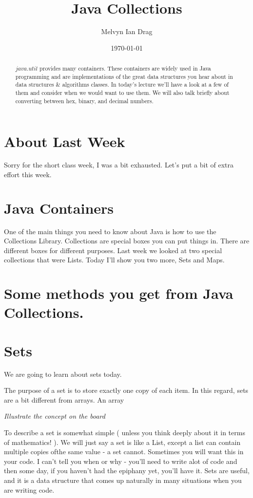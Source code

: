 \documentclass[12pt]{article}
\title{Java Collections}
\author{
	Melvyn Ian Drag
}
\date{\today}
\begin{document}
\maketitle

\begin{abstract}
$java.util$ provides many containers. These containers are widely used in Java
programming and are implementations of the great data structures you hear about
in data structures \& algorithms classes. In today's lecture we'll have a look
at a few of them and consider when we would want to use them. We will also talk
briefly about converting between hex, binary, and decimal numbers.
\end{abstract}

\section{About Last Week}
Sorry for the short class week, I was a bit exhausted. Let's put a bit of extra
effort this week.

\section{Java Containers}
One of the main things you need to know about Java is how to use the Collections
Library. Collections are special boxes you can put things in. There are
different boxes for different purposes. Last week we looked at two special
collections that were Lists. Today I'll show you two more, Sets and Maps.

\section{Some methods you get from Java Collections.}


\section{Sets}
We are going to learn about sets today.

The purpose of a set is to store exactly one copy of each item. In this regard, sets are a bit different from arrays. An array 

\textit{Illustrate the concept on the board}

To describe a set is somewhat simple ( unless you think deeply about it in terms of mathematics! ). We will just say a set is like a List, except a list can contain multiple copies ofthe same value - a set cannot. Sometimes you will want this in your code. I can't tell you when or why - you'll need to write alot of code and then some day, if you haven't had the epiphany yet, you'll have it. Sets are useful, and it is a data structure that comes up naturally in many situations when you are writing code. 
\end{document}
